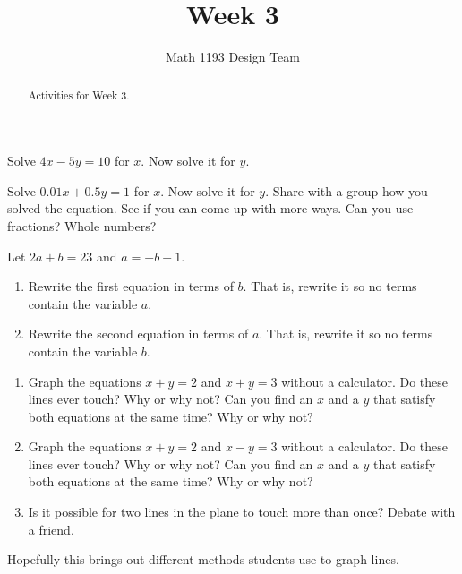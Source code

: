 \documentclass[noauthor,noinstructornotes]{ximera}
\title{Week 3}
\author{Math 1193 Design Team}
\begin{document}
\begin{abstract}
    Activities for Week 3.
\end{abstract}
\maketitle

\begin{problem}
Solve \(4x - 5y = 10\) for \(x\). Now solve it for \(y\).
\end{problem}

\begin{problem}
Solve \(0.01x + 0.5y = 1\) for \(x\). Now solve it for \(y\).
Share with a group how you solved the equation. See if you can come up with more ways. Can you use fractions? Whole numbers?
\end{problem}

\begin{problem}
Let \(2a + b = 23\) and \(a = -b + 1\). 
\begin{enumerate}
    \item Rewrite the first equation in terms of \(b\). That is, rewrite it so no terms contain the variable \(a\).
    \item Rewrite the second equation in terms of \(a\). That is, rewrite it so no terms contain the variable \(b\).
\end{enumerate}
\end{problem}

\begin{problem}
\begin{enumerate}
    \item Graph the equations \(x + y = 2\) and \(x + y = 3\)
    without a calculator. Do these lines ever touch? Why or why not?
    Can you find an \(x\) and a \(y\) that satisfy both equations at 
    the same time? Why or why not? 
    \item Graph the equations \(x + y = 2\) and \(x - y = 3\)
    without a calculator. Do these lines ever touch? Why or why not?
    Can you find an \(x\) and a \(y\) that satisfy both equations at 
    the same time? Why or why not? 
    \item Is it possible for two lines in the 
    plane to touch more than once? Debate with a friend.
\end{enumerate}

\begin{instructorNotes}
Hopefully this brings out different methods students use to graph lines.
\end{instructorNotes}
\end{problem}
\end{document}
